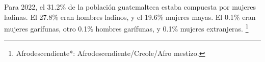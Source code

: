 Para 2022, el 31.2\% de la población guatemalteca estaba compuesta por mujeres ladinas. El 27.8\% eran hombres ladinos, y el 19.6\% mujeres mayas. El 0.1\% eran mujeres garífunas, otro 0.1\% hombres garífunas, y 0.1\% mujeres extranjeras. \footnote{Afrodescendiente*: Afrodescendiente/Creole/Afro mestizo.}